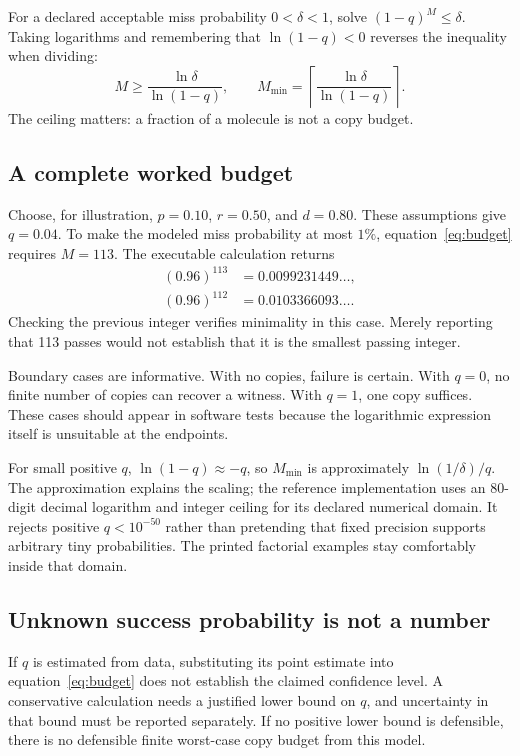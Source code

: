 For a declared acceptable miss probability $0<\delta<1$, solve $(1-q)^M\leq\delta$. Taking logarithms and remembering that $\ln(1-q)<0$ reverses the inequality when dividing:
\begin{equation}
M\geq\frac{\ln\delta}{\ln(1-q)},\qquad
M_{\min}=\left\lceil\frac{\ln\delta}{\ln(1-q)}\right\rceil.
\label{eq:budget}
\end{equation}
The ceiling matters: a fraction of a molecule is not a copy budget.

\subsection{A complete worked budget}

Choose, for illustration, $p=0.10$, $r=0.50$, and $d=0.80$. These assumptions give $q=0.04$. To make the modeled miss probability at most $1\%$, equation~\ref{eq:budget} requires $M=113$. The executable calculation returns
\begin{align}
(0.96)^{113}&=0.0099231449\ldots,\\
(0.96)^{112}&=0.0103366093\ldots.
\end{align}
Checking the previous integer verifies minimality in this case. Merely reporting that 113 passes would not establish that it is the smallest passing integer.

Boundary cases are informative. With no copies, failure is certain. With $q=0$, no finite number of copies can recover a witness. With $q=1$, one copy suffices. These cases should appear in software tests because the logarithmic expression itself is unsuitable at the endpoints.

For small positive $q$, $\ln(1-q)\approx-q$, so $M_{\min}$ is approximately $\ln(1/\delta)/q$. The approximation explains the scaling; the reference implementation uses an 80-digit decimal logarithm and integer ceiling for its declared numerical domain. It rejects positive $q<10^{-50}$ rather than pretending that fixed precision supports arbitrary tiny probabilities. The printed factorial examples stay comfortably inside that domain.

\subsection{Unknown success probability is not a number}

If $q$ is estimated from data, substituting its point estimate into equation~\ref{eq:budget} does not establish the claimed confidence level. A conservative calculation needs a justified lower bound on $q$, and uncertainty in that bound must be reported separately. If no positive lower bound is defensible, there is no defensible finite worst-case copy budget from this model.

